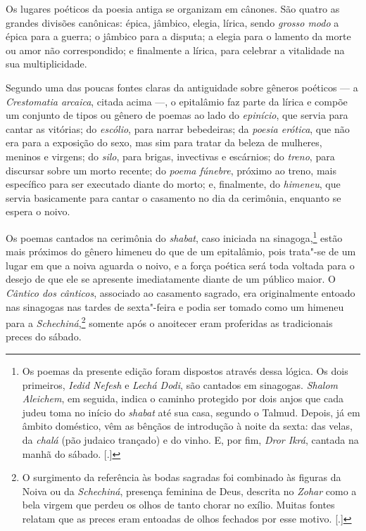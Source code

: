 {{Os lugares poéticos da poesia antiga se organizam em cânones. São quatro
as grandes divisões canônicas: épica, jâmbico, elegia, lírica, sendo
\emph{grosso modo} a épica para a guerra; o jâmbico para a disputa; a
elegia para o lamento da morte ou amor não correspondido; e finalmente a
lírica, para celebrar a vitalidade na sua multiplicidade.

Segundo uma das poucas fontes claras da antiguidade sobre gêneros
poéticos --- a \emph{Crestomatia arcaica}, citada acima ---, o
epitalâmio faz parte da lírica e compõe um conjunto de tipos ou gênero
de poemas ao lado do \emph{epinício}, que servia para cantar as
vitórias; do \emph{escólio}, para narrar bebedeiras; da \emph{poesia
erótica}, que não era para a exposição do sexo, mas sim para tratar da
beleza de mulheres, meninos e virgens; do \emph{silo}, para brigas,
invectivas e escárnios; do \emph{treno}, para discursar sobre um morto
recente; do \emph{poema fúnebre}, próximo ao treno, mais específico para
ser executado diante do morto; e, finalmente, do \emph{himeneu}, que
servia basicamente para cantar o casamento no dia da cerimônia,
enquanto se espera o noivo.

Os poemas cantados na cerimônia do \emph{shabat}, caso iniciada na sinagoga,\footnote{Os poemas da presente edição foram dispostos através dessa lógica. Os dois primeiros, \emph{Iedid Nefesh} e \emph{Lechá Dodi}, são cantados em sinagogas. \emph{Shalom Aleichem}, em seguida, indica o caminho protegido por dois anjos que cada judeu toma no início do \emph{shabat} até sua casa, segundo o Talmud. Depois, já em âmbito doméstico, vêm as bênçãos de introdução à noite da sexta: das velas, da \emph{chalá} (pão judaico trançado) e do vinho. E, por fim, \emph{Dror Ikrá}, cantada na manhã do sábado. [.]}
estão mais próximos do gênero himeneu do que de um epitalâmio, pois
trata"-se de um lugar em que a noiva aguarda o noivo, e a força poética
será toda voltada para o desejo de que ele se apresente imediatamente
diante de um público maior. O \emph{Cântico dos cânticos}, associado ao
casamento sagrado, era originalmente entoado nas sinagogas nas tardes de
sexta"-feira e podia ser tomado como um himeneu para a \emph{Schechiná},\footnote{O surgimento da referência às bodas sagradas foi combinado às figuras da Noiva ou da \emph{Schechiná}, presença feminina de Deus, descrita no \emph{Zohar} como a bela virgem que perdeu os olhos de tanto chorar no exílio. Muitas fontes relatam que as preces eram entoadas de olhos fechados por esse motivo. [.]}
somente após o anoitecer eram proferidas as tradicionais preces do
sábado.

}}
